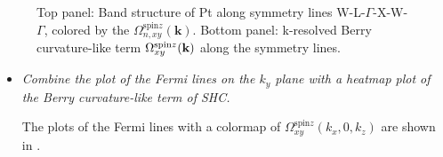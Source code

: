 \begin{figure}[htb!]
\centering
{}\qquad
{}
\caption{Top panel: Band structure of Pt along symmetry lines W-L-$\Gamma$-X-W-$\Gamma$, colored by
the $\Omega_{n,xy}^{\text{spin}z}({\bm k})$. 
Bottom panel: k-resolved Berry curvature-like term $\Omega_{xy}^{\text{spin}z}(\bf k)$ along the symmetry lines.}
\label{fig29.1}
\end{figure}
\clearpage

\begin{itemize}
	\item {\it Combine the plot of the Fermi lines on the $k_y$ plane with a heatmap plot of the Berry curvature-like term of SHC.}

	The plots of the Fermi lines with a colormap of $\Omega_{xy}^{\text{spin}z}(k_x,0,k_z)$ are shown in .
\end{itemize}


